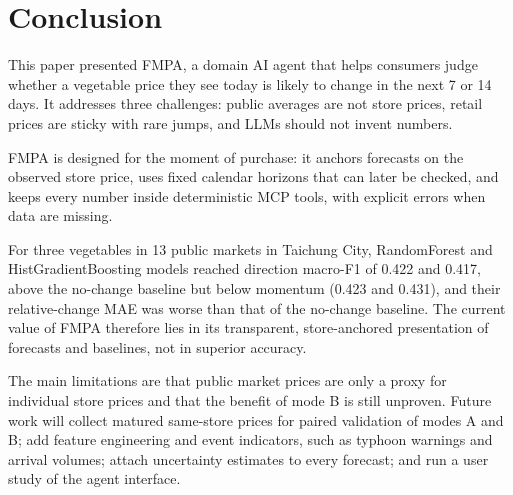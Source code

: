 \section{Conclusion}\label{sec:conclusion}

This paper presented FMPA, a domain AI agent that helps consumers judge whether
a vegetable price they see today is likely to change in the next 7 or 14 days.
It addresses three challenges: public averages are not store prices, retail
prices are sticky with rare jumps, and LLMs should not invent numbers.

FMPA is designed for the moment of purchase: it anchors forecasts on the
observed store price, uses fixed calendar horizons that can later be checked,
and keeps every number inside deterministic MCP tools, with explicit errors
when data are missing.

For three vegetables in 13 public markets in Taichung City, RandomForest and
HistGradientBoosting models reached direction macro-F1 of 0.422 and 0.417,
above the no-change baseline but below momentum (0.423 and 0.431), and their
relative-change MAE was worse than that of the no-change baseline. The current
value of FMPA therefore lies in its transparent, store-anchored presentation of
forecasts and baselines, not in superior accuracy.

The main limitations are that public market prices are only a proxy for
individual store prices and that the benefit of mode B is still unproven.
Future work will collect matured same-store prices for paired validation of
modes A and B; add feature engineering and event
indicators, such as typhoon warnings and arrival volumes; attach uncertainty
estimates to every forecast; and run a user study of the agent interface.
